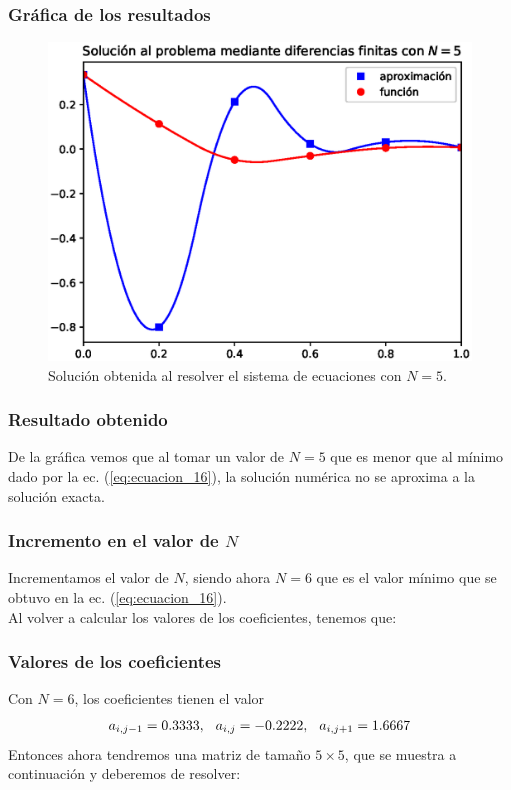 \begin{frame}
\frametitle{Gráfica de los resultados}
\begin{figure}[h!]
    \centering
    \includegraphics[scale=0.5]{Imagenes/metodo_diferencias_finitas_02.eps}
    \caption{Solución obtenida al resolver el sistema de ecuaciones con $N=5$.}
\end{figure}
\end{frame}
\begin{frame}
\frametitle{Resultado obtenido}
De la gráfica vemos que al tomar un valor de $N = 5$ que es menor que al mínimo dado por la ec. (\ref{eq:ecuacion_16}), la solución numérica no se aproxima a la solución exacta.
\end{frame}
\begin{frame}
\frametitle{Incremento en el valor de $N$}
Incrementamos el valor de $N$, siendo ahora $N=6$  que es el valor mínimo que se obtuvo en la ec. (\ref{eq:ecuacion_16}).
\\
\bigskip
Al volver a calcular los valores de los coeficientes, tenemos que:
\end{frame}
\begin{frame}
\frametitle{Valores de los coeficientes}
Con $N = 6$, los coeficientes tienen el valor
\begin{align*}
a_{i, j-1} = 0.3333, \hspace{0.25cm} a_{i, j} = -0.2222, \hspace{0.25cm} a_{i, j+1} = 1.6667
\end{align*}
Entonces ahora tendremos una matriz de tamaño $5 \times 5$, que se muestra a continuación y  deberemos de resolver:
\end{frame}
